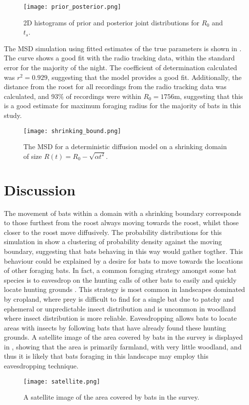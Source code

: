 \begin{figure} [h]
    \centering
        \texttt{[image: prior\_posterior.png]}
        \caption{2D histograms of prior and posterior joint distributions for $R_0$ and $t_s$.}
    \label{fig:posterior}
\end{figure}

 The MSD simulation using fitted estimates of the true parameters is shown in . The curve shows a good fit with the radio tracking data, within the standard error for the majority of the night. The coefficient of determination calculated was $r^2 = 0.929$, suggesting that the model provides a good fit. Additionally, the distance from the roost for all recordings from the radio tracking data was calculated, and 93\% of recordings were within $R_0 = 1756$m, suggesting that this is a good estimate for maximum foraging radius for the majority of bats in this study.

\begin{figure} [h]
    \centering
        \texttt{[image: shrinking\_bound.png]}
        \caption{The MSD for a deterministic diffusion model on a shrinking domain of size $R(t) = R_0 - \sqrt{\alpha t^2}$. }
    \label{fig:fit}
\end{figure}

\section{Discussion}

 The movement of bats within a domain with a shrinking boundary corresponds to those furthest from the roost always moving towards the roost, whilst those closer to the roost move diffusively. The probability distributions for this simulation in  show a clustering of probability density against the moving boundary, suggesting that bats behaving in this way would gather togther. This behaviour could be explained by a desire for bats to move towards the locations of other foraging bats. In fact, a common foraging strategy amongst some bat species is to eavesdrop on the hunting calls of other bats to easily and quickly locate hunting grounds \cite{roelekelandscape, egert2018resource}. This strategy is most common in landscapes dominated by cropland, where prey is difficult to find for a single bat due to patchy and ephemeral or unpredictable insect distribution and is uncommon in woodland where insect distribution is more reliable. Eavesdropping allows bats to locate areas with insects by following bats that have already found these hunting grounds. A satellite image of the area covered by bats in the survey is displayed in , showing that the area is primarily farmland, with very little woodland, and thus it is likely that bats foraging in this landscape may employ this eavesdropping technique.



\begin{figure} [h]
    \centering
        \texttt{[image: satellite.png]}
        \caption{A satellite image of the area covered by bats in the survey. }
    \label{fig:satellite}
\end{figure}
